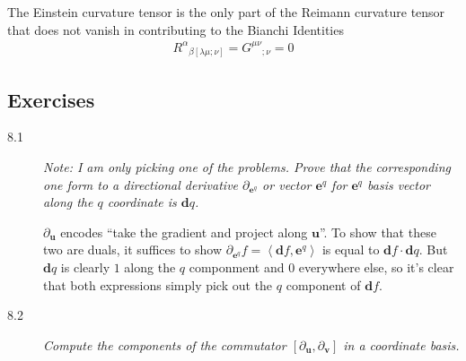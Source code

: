 \documentclass[12pt]{report}
\newcommand{\bm}[1]{\boldsymbol{\mathbf{#1}}}
\newcommand{\expvalue}[1]{\left<#1\right>}
\begin{document}
\begin{description}
        The Einstein curvature tensor is the only part of the Reimann curvature
        tensor that does not vanish in contributing to the Bianchi Identities
        \begin{align*}
            {R^\alpha}_{\beta[\lambda\mu;\nu]} = {G^{\mu\nu}}_{;\nu} = 0
        \end{align*}
\end{description}

\subsection{Exercises}

\begin{description}
    \item[8.1] \emph{Note: I am only picking one of the problems. Prove that the
        corresponding one form to a directional derivative $\partial_{\bm{e}^q}$
        or vector $\bm{e}^q$ for $\bm{e}^q$ basis vector along the $q$
        coordinate is $\bm{d}q$.}

        $\partial_{\bm{u}}$ encodes ``take the gradient and project along
        $\bm{u}$''. To show that these two are duals, it suffices to show
        $\partial_{\bm{e}^q}f = \expvalue{\bm{d}f, \bm{e}^q}$ is equal to
        $\bm{d}f \cdot \bm{d}q$. But $\bm{d}q$ is clearly $1$ along the $q$
        componment and $0$ everywhere else, so it's clear that both expressions
        simply pick out the $q$ component of $\bm{d}f$.

    \item[8.2] \emph{Compute the components of the commutator $\left[
        \partial_{\bm{u}}, \partial_{\bm{v}} \right]$ in a coordinate basis.}


\end{description}
\end{document}
